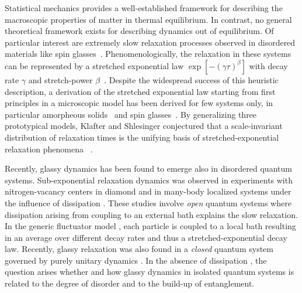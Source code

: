 \documentclass[aps,twocolumn,
superscriptaddress,
footinbib,
prl]{revtex4-1}
\begin{document}
Statistical mechanics provides a well-established framework for describing the macroscopic properties of matter in thermal equilibrium. In contrast, no general theoretical framework exists for describing dynamics out of equilibrium. Of particular interest are extremely slow relaxation processes observed in disordered materials like spin glasses~\cite{Binder1986SpinQuestions, phillips_1996}.
Phenomenologically, the relaxation in these systems can be represented by a stretched exponential law $\exp[-(\gamma \tau)^\beta]$ with decay rate $\gamma$ and stretch-power $\beta$~\cite{1854AnP...167...56K}. Despite the widespread success of this heuristic description, a derivation of the stretched exponential law starting from first principles in a microscopic model has been derived for few systems only, in particular amorpheous solids~\cite{phillips_1996} and spin glasses~\cite{DeDominicis1985StretchedEnergies, phillips_1996}. By generalizing three prototypical models, Klafter and Shlesinger conjectured that a scale-invariant distribution of relaxation times is the unifying basis of stretched-exponential relaxation phenomena ~\cite{Klafter1986OnSystems}.

Recently, glassy dynamics has been found to emerge also in disordered quantum systems. Sub-exponential relaxation dynamics was observed in experiments with nitrogen-vacancy centers in diamond \cite{Choi2017DepolarizationEnsemble, Kucsko2018CriticalDiamond,davis2021probing} and in many-body localized systems under the influence of dissipation \cite{Everest2017RoleSystem}.
These studies involve \emph{open} quantum systems where dissipation arising from coupling to an external bath explains the slow relaxation. In the generic fluctuator model \cite{Choi2017DepolarizationEnsemble}, each particle is coupled to a local bath resulting in an average over different decay rates and thus a stretched-exponential decay law.
Recently, glassy relaxation was also found in a \emph{closed} quantum system governed by purely unitary dynamics \cite{Signoles2021GlassySystem}. In the absence of dissipation
, the question arises whether and how glassy dynamics in isolated quantum systems is related to the degree of disorder and to the build-up of entanglement.
\end{document}
